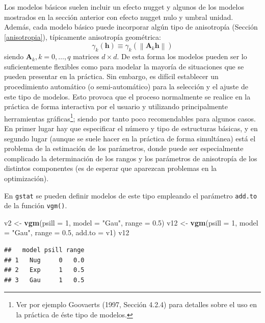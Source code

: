 \documentclass[
]{book}
\newenvironment{Shaded}{\begin{snugshade}}{\end{snugshade}}
\newcommand{\AttributeTok}[1]{\textcolor[rgb]{0.13,0.29,0.53}{#1}}
\newcommand{\DecValTok}[1]{\textcolor[rgb]{0.00,0.00,0.81}{#1}}
\newcommand{\FloatTok}[1]{\textcolor[rgb]{0.00,0.00,0.81}{#1}}
\newcommand{\FunctionTok}[1]{\textcolor[rgb]{0.13,0.29,0.53}{\textbf{#1}}}
\newcommand{\NormalTok}[1]{#1}
\newcommand{\OtherTok}[1]{\textcolor[rgb]{0.56,0.35,0.01}{#1}}
\newcommand{\StringTok}[1]{\textcolor[rgb]{0.31,0.60,0.02}{#1}}
\theoremstyle{break}
\theoremstyle{definition}
\theoremstyle{definition}
\theoremstyle{definition}
\theoremstyle{definition}
\theoremstyle{remark}
\begin{document}
Los modelos básicos suelen incluir un efecto nugget y algunos de los modelos mostrados en la sección anterior con efecto nugget nulo y umbral unidad.
Además, cada modelo básico puede incorporar algún tipo de anisotropía (Sección \ref{anisotropia}), típicamente anisotropía geométrica:
\[\gamma_{k}(\mathbf{h})\equiv \gamma_{k}^{} \left( \left\| \mathbf{A}_{k} \mathbf{h}\right\| \right)\]
siendo \(\mathbf{A}_{k} ,k=0,\ldots,q\) matrices \(d\times d\).
De esta forma los modelos pueden ser lo suficientemente flexibles como para modelar la mayoría de situaciones que se pueden presentar en la práctica.
Sin embargo, es difícil establecer un procedimiento automático (o semi-automático) para la selección y el ajuste de este tipo de modelos.
Esto provoca que el proceso normalmente se realice en la práctica de forma interactiva por el usuario y utilizando principalmente herramientas gráficas\footnote{Ver por ejemplo Goovaerts (1997, Sección 4.2.4) para detalles sobre el uso en la práctica de éste tipo de modelos.}; siendo por tanto poco recomendables para algunos casos.
En primer lugar hay que especificar el número y tipo de estructuras básicas, y en segundo lugar (aunque se suele hacer en la práctica de forma simultánea) está el problema de la estimación de los parámetros, donde puede ser especialmente complicado la determinación de los rangos y los parámetros de anisotropía de los distintos componentes (es de esperar que aparezcan problemas en la optimización).

En \texttt{gstat} se pueden definir modelos de este tipo empleando el parámetro \texttt{add.to} de la función \texttt{vgm()}.

\begin{Shaded}
\begin{Highlighting}[]
\NormalTok{v2 }\OtherTok{\textless{}{-}} \FunctionTok{vgm}\NormalTok{(}\AttributeTok{psill =} \DecValTok{1}\NormalTok{, }\AttributeTok{model =} \StringTok{"Gau"}\NormalTok{, }\AttributeTok{range =} \FloatTok{0.5}\NormalTok{)}
\NormalTok{v12 }\OtherTok{\textless{}{-}} \FunctionTok{vgm}\NormalTok{(}\AttributeTok{psill =} \DecValTok{1}\NormalTok{, }\AttributeTok{model =} \StringTok{"Gau"}\NormalTok{, }\AttributeTok{range =} \FloatTok{0.5}\NormalTok{, }\AttributeTok{add.to =}\NormalTok{ v1)}
\NormalTok{v12}
\end{Highlighting}
\end{Shaded}

\begin{verbatim}
##   model psill range
## 1   Nug     0   0.0
## 2   Exp     1   0.5
## 3   Gau     1   0.5
\end{verbatim}
\end{document}
